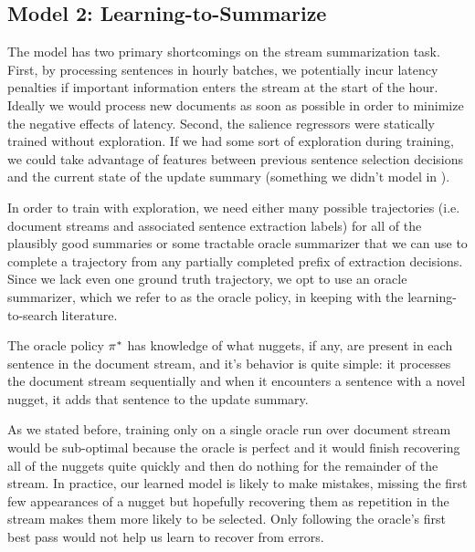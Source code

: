\subsection{Model 2: Learning-to-Summarize}

The \sap{} model has two primary shortcomings on the stream summarization
task. First, by processing sentences in hourly batches, we potentially 
incur latency penalties if important information enters the stream
at the start of the hour.
Ideally we would process new documents as soon as possible in order 
to minimize the negative effects of latency. Second, the salience
regressors were statically trained without exploration. If we had 
some sort of exploration during training, we could take advantage of 
features between previous sentence selection decisions and the current
state of the update summary (something we didn't model in \sap).

In order to train with exploration, we need either many possible trajectories
(i.e. document streams and associated sentence extraction labels) for all
of the plausibly good summaries or some tractable oracle summarizer 
that we can use to complete a trajectory from any partially completed prefix
of extraction decisions. Since we lack even one ground truth trajectory, we
opt to use an oracle summarizer, which we refer to as the oracle policy, 
in keeping with the learning-to-search literature.




The oracle policy $\pi^{*}$ has knowledge of what nuggets, 
if any, are present in each sentence in the document stream, and it's behavior
is quite simple: it processes the document stream sequentially and when it 
encounters a sentence with a novel nugget, it adds that sentence to the update
summary.


As we stated before, training only on a single oracle run over document stream
would be sub-optimal because the oracle is perfect and it would finish 
recovering all of the nuggets quite quickly and then do nothing for
the remainder of the stream. In practice, our learned model is likely to
make mistakes, missing the first few appearances of a nugget but hopefully
recovering them as repetition in the stream makes them more likely to be 
selected. Only following the oracle's first best pass would not help us learn
to recover from errors.

